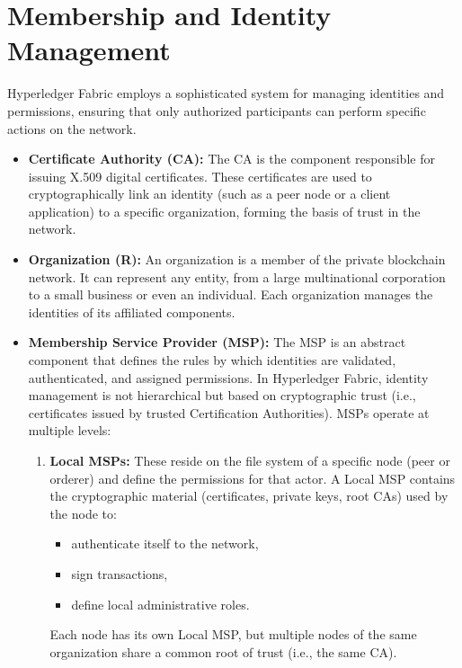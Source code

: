 \documentclass{scrbook}
\begin{document}
\section{Membership and Identity Management}

Hyperledger Fabric employs a sophisticated system for managing identities and permissions, ensuring that only authorized participants can perform specific actions on the network.

\begin{itemize}
    \item \textbf{Certificate Authority (CA):} The CA is the component responsible for issuing X.509 digital certificates. These certificates are used to cryptographically link an identity (such as a peer node or a client application) to a specific organization, forming the basis of trust in the network.

    \item \textbf{Organization (R):} An organization is a member of the private blockchain network. It can represent any entity, from a large multinational corporation to a small business or even an individual. Each organization manages the identities of its affiliated components.

    \item \textbf{Membership Service Provider (MSP):} The MSP is an abstract component that defines the rules by which identities are validated, authenticated, and assigned permissions. In Hyperledger Fabric, identity management is not hierarchical but based on cryptographic trust (i.e., certificates issued by trusted Certification Authorities). MSPs operate at multiple levels:

    \begin{enumerate}
        \item \textbf{Local MSPs:} These reside on the file system of a specific node (peer or orderer) and define the permissions for that actor. A Local MSP contains the cryptographic material (certificates, private keys, root CAs) used by the node to:
        \begin{itemize}
            \item authenticate itself to the network,
            \item sign transactions,
            \item define local administrative roles.
        \end{itemize}
        Each node has its own Local MSP, but multiple nodes of the same organization share a common root of trust (i.e., the same CA).
    

\end{enumerate}
\end{itemize}
\end{document}
